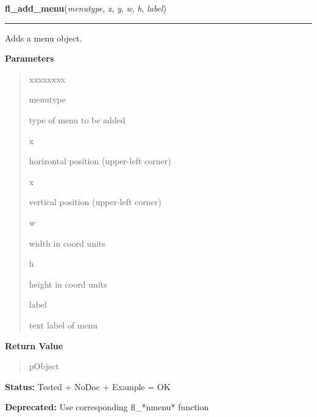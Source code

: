    \label{xformslib:library:fl_add_menu}

    \vspace{0.5ex}

\hspace{.8\funcindent}\begin{boxedminipage}{\funcwidth}

    \raggedright \textbf{fl\_add\_menu}(\textit{menutype}, \textit{x}, \textit{y}, \textit{w}, \textit{h}, \textit{label})

    \vspace{-1.5ex}

    \rule{\textwidth}{0.5\fboxrule}
\setlength{\parskip}{2ex}
    Adds a menu object.

\setlength{\parskip}{1ex}
      \textbf{Parameters}
      \vspace{-1ex}

      \begin{quote}
        \begin{Ventry}{xxxxxxxx}

          \item[menutype]

          type of menu to be added

          \item[x]

          horizontal position (upper-left corner)

          \item[x]

          vertical position (upper-left corner)

          \item[w]

          width in coord units

          \item[h]

          height in coord units

          \item[label]

          text label of menu

        \end{Ventry}

      \end{quote}

      \textbf{Return Value}
    \vspace{-1ex}

      \begin{quote}
      pObject

      \end{quote}

\textbf{Status:} Tested + NoDoc + Example = OK



\textbf{Deprecated:} Use corresponding fl\_*nmenu* function



    \end{boxedminipage}

